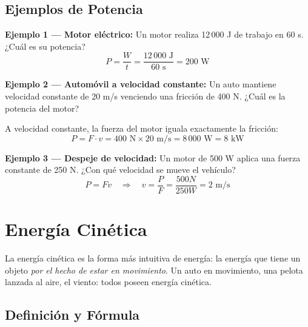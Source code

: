 \newpage
\subsection{Ejemplos de Potencia}

\begin{seccion}
\textbf{Ejemplo 1 --- Motor eléctrico:} Un motor realiza 12\,000 J de trabajo en 60 s. ¿Cuál es su potencia?
$$P = \frac{W}{t} = \frac{12\,000 \text{ J}}{60 \text{ s}} = 200 \text{ W}$$

\textbf{Ejemplo 2 --- Automóvil a velocidad constante:} Un auto mantiene velocidad constante de 20 m/s venciendo una fricción de 400 N. ¿Cuál es la potencia del motor?

A velocidad constante, la fuerza del motor iguala exactamente la fricción:
$$P = F \cdot v = 400 \text{ N} \times 20 \text{ m/s} = 8\,000 \text{ W} = 8 \text{ kW}$$

\textbf{Ejemplo 3 --- Despeje de velocidad:} Un motor de 500 W aplica una fuerza constante de 250 N. ¿Con qué velocidad se mueve el vehículo?
$$P = Fv \quad \Rightarrow \quad v = \frac{P}{F} = \frac{500N}{250W} = 2 \text{ m/s}$$
\end{seccion}

\newpage

\section{Energía Cinética}

\begin{seccion}
La energía cinética es la forma más intuitiva de energía: la energía que tiene un objeto \textit{por el hecho de estar en movimiento}. Un auto en movimiento, una pelota lanzada al aire, el viento: todos poseen energía cinética.
\end{seccion}

\subsection{Definición y Fórmula}

